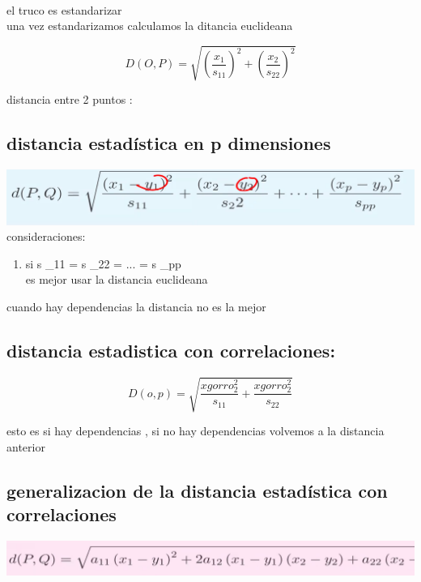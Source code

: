 \documentclass[10pt,a4paper]{article} %
\begin{document}
            \\ el truco es estandarizar
            \\ una vez estandarizamos calculamos la ditancia euclideana
                
            \begin{equation}
                D(O,P) =  \sqrt{(\frac{x_1}{s _{11} })^{2} + (\frac{x_2}{s _{22} } )^{2}  } 
            \end{equation}

            distancia entre 2 puntos :
            \subsection{distancia estadística en p dimensiones}
                \includegraphics[width=0.8\linewidth]{distancia_p_dimensiones.png}
                consideraciones:
                \begin{enumerate}
                    \item {si s _{11} = s _{22} = ... =  s _{pp} 
                    \\ es mejor usar la distancia euclideana   } 
                \end{enumerate}
                cuando hay dependencias la distancia no es la mejor
            \subsection{distancia estadistica con correlaciones:}
                \begin{equation}
                    D(o,p) = \sqrt{ \frac{xgorro _{2} ^{2}} {s _{11} } + \frac{xgorro _{2} ^{2}  }{ s _{22} } } 
                \end{equation}
                
                esto es si hay dependencias , si no hay dependencias volvemos a
                la distancia anterior
            \subsection{generalizacion de la distancia estadística con correlaciones}
                \includegraphics[width=0.6\linewidth]{distancia_estadistica_corr.png}
\end{document}
